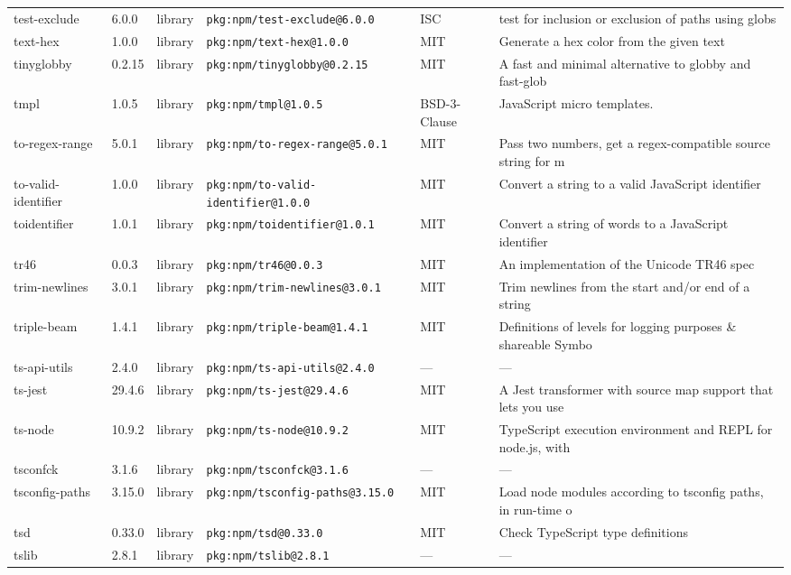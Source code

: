 \documentclass[11pt]{article}
\begin{document}
\begin{longtable}{|l|l|l|p{2.2cm}|l|p{4cm}|}
test-exclude & 6.0.0 & library & \texttt{pkg:npm/test-exclude@6.0.0} & ISC & test for inclusion or exclusion of paths using globs \\
text-hex & 1.0.0 & library & \texttt{pkg:npm/text-hex@1.0.0} & MIT & Generate a hex color from the given text \\
tinyglobby & 0.2.15 & library & \texttt{pkg:npm/tinyglobby@0.2.15} & MIT & A fast and minimal alternative to globby and fast-glob \\
tmpl & 1.0.5 & library & \texttt{pkg:npm/tmpl@1.0.5} & BSD-3-Clause & JavaScript micro templates. \\
to-regex-range & 5.0.1 & library & \texttt{pkg:npm/to-regex-range@5.0.1} & MIT & Pass two numbers, get a regex-compatible source string for m \\
to-valid-identifier & 1.0.0 & library & \texttt{pkg:npm/to-valid-identifier@1.0.0} & MIT & Convert a string to a valid JavaScript identifier \\
toidentifier & 1.0.1 & library & \texttt{pkg:npm/toidentifier@1.0.1} & MIT & Convert a string of words to a JavaScript identifier \\
tr46 & 0.0.3 & library & \texttt{pkg:npm/tr46@0.0.3} & MIT & An implementation of the Unicode TR46 spec \\
trim-newlines & 3.0.1 & library & \texttt{pkg:npm/trim-newlines@3.0.1} & MIT & Trim newlines from the start and/or end of a string \\
triple-beam & 1.4.1 & library & \texttt{pkg:npm/triple-beam@1.4.1} & MIT & Definitions of levels for logging purposes \& shareable Symbo \\
ts-api-utils & 2.4.0 & library & \texttt{pkg:npm/ts-api-utils@2.4.0} & — & — \\
ts-jest & 29.4.6 & library & \texttt{pkg:npm/ts-jest@29.4.6} & MIT & A Jest transformer with source map support that lets you use \\
ts-node & 10.9.2 & library & \texttt{pkg:npm/ts-node@10.9.2} & MIT & TypeScript execution environment and REPL for node.js, with  \\
tsconfck & 3.1.6 & library & \texttt{pkg:npm/tsconfck@3.1.6} & — & — \\
tsconfig-paths & 3.15.0 & library & \texttt{pkg:npm/tsconfig-paths@3.15.0} & MIT & Load node modules according to tsconfig paths, in run-time o \\
tsd & 0.33.0 & library & \texttt{pkg:npm/tsd@0.33.0} & MIT & Check TypeScript type definitions \\
tslib & 2.8.1 & library & \texttt{pkg:npm/tslib@2.8.1} & — & — \\

\end{longtable}
\end{document}
